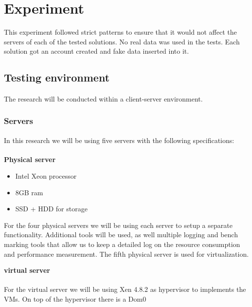 \section{Experiment}
\paragraph{}
This experiment followed strict patterns to ensure that it would not affect the servers of each of the tested solutions. No real data was used in the tests. Each solution got an account created and fake data inserted into it.


\subsection{Testing environment}
\paragraph{}
The research will be conducted within a client-server environment.

\subsubsection{Servers}
\paragraph{}
In this research we will be using five servers with the following specifications:\\~\\
\textbf{Physical server}
\begin{itemize}
	\item Intel Xeon processor
	\item 8GB ram
	\item SSD + HDD for storage
\end{itemize}

 For the four physical servers we will be using each server to setup a separate functionality. Additional tools will be used, as well multiple logging and bench marking tools that allow us to keep a detailed log on the resource consumption and performance measurement. The fifth physical server is used for virtualization.

\textbf{virtual server}
\paragraph{}
For the virtual server we will be using Xen 4.8.2 as hypervisor to implements the VMs. On top of the hypervisor there is a Dom0

